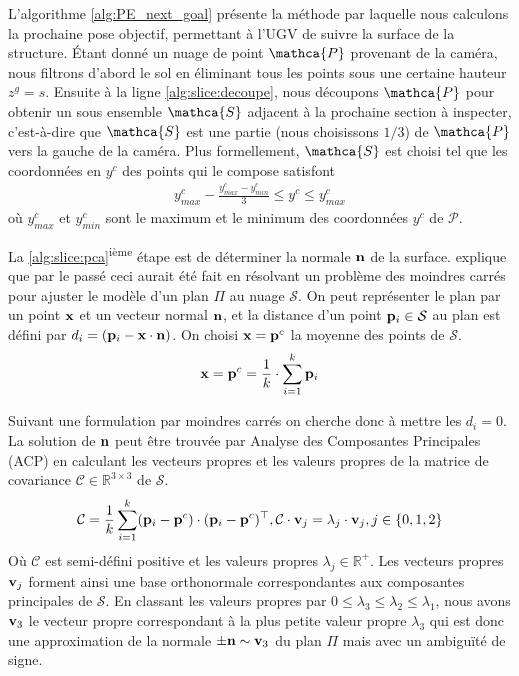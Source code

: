 L'algorithme \ref{alg:PE_next_goal} présente la méthode par laquelle nous calculons la prochaine pose objectif, permettant à l'UGV de suivre la surface de la structure. Étant donné un nuage de point $\mathca{P}$ provenant de la caméra, nous filtrons d'abord le sol en éliminant tous les points sous une certaine hauteur $z^g = s$. Ensuite à la ligne \ref{alg:slice:decoupe}, nous découpons $\mathca{P}$ pour obtenir un sous ensemble $\mathca{S}$ adjacent à la prochaine section à inspecter, c'est-à-dire que $\mathca{S}$ est une partie (nous choisissons $1/3$) de $\mathca{P}$ vers la gauche de la caméra. Plus formellement, $\mathca{S}$ est choisi tel que les coordonnées en $y^c$ des points qui le compose satisfont
\begin{align}
  y^c_{max} - \frac{y^c_{max} - y^c_{min}}{3} \leq y^c \leq y^c_{max}
\end{align}
où $y^c_{max}$ et $y^c_{min}$ sont le maximum et le minimum des coordonnées $y^c$ de $\mathcal{P}$.

La \ref{alg:slice:pca}\textsuperscript{ième} étape est de déterminer la normale $\mathbf{n}$ de la surface. \citep{Rusu2009} explique que par le passé ceci aurait été fait en résolvant un problème des moindres carrés pour ajuster le modèle d'un plan $\Pi$ au nuage $\mathcal{S}$. On peut représenter le plan par un point $\mathbf{x}$ et un vecteur normal $\mathbf{n}$, et la distance d'un point $\mathbf{p}_i \in \mathcal{S}$ au plan est défini par $d_i = (\mathbf{p}_i - \mathbf{x} \cdot \mathbf{n})$. On choisi $\mathbf{x} = \mathbf{p}^c$ la moyenne des points de $\mathcal{S}$.
\begin{align}
  \mathbf{x} = \mathbf{p}^c = \frac{1}{k} \cdot \sum^{k}_{i=1} \mathbf{p}_i
\end{align}

Suivant une formulation par moindres carrés on cherche donc à mettre les $d_i = 0$. La solution de $\mathbf{n}$ peut être trouvée par Analyse des Composantes Principales (ACP) en calculant les vecteurs propres et les valeurs propres de la matrice de covariance $\mathcal{C} \in \mathbb{R}^{3\times 3}$ de $\mathcal{S}$.
\begin{align}
  \mathcal{C} = \frac{1}{k} \sum^{k}_{i=1} (\mathbf{p}_i - \mathbf{p}^c) \cdot (\mathbf{p}_i - \mathbf{p}^c)^\top, \mathcal{C} \cdot \mathbf{v}_j = \lambda_j \cdot \mathbf{v}_j, j \in \{0, 1, 2\}
\end{align}
Où $\mathcal{C}$ est semi-défini positive et les valeurs propres $\lambda_j \in \mathbb{R}^+$. Les vecteurs propres $\mathbf{v}_j$ forment ainsi une base orthonormale correspondantes aux composantes principales de $\mathcal{S}$. En classant les valeurs propres par $0 \leq \lambda_3 \leq \lambda_2 \leq \lambda_1$, nous avons $\mathbf{v}_3$ le vecteur propre correspondant à la plus petite valeur propre $\lambda_3$ qui est donc une approximation de la normale $\pm \mathbf{n} \sim \mathbf{v}_{3}$ du plan $\Pi$ mais avec un ambiguïté de signe.

